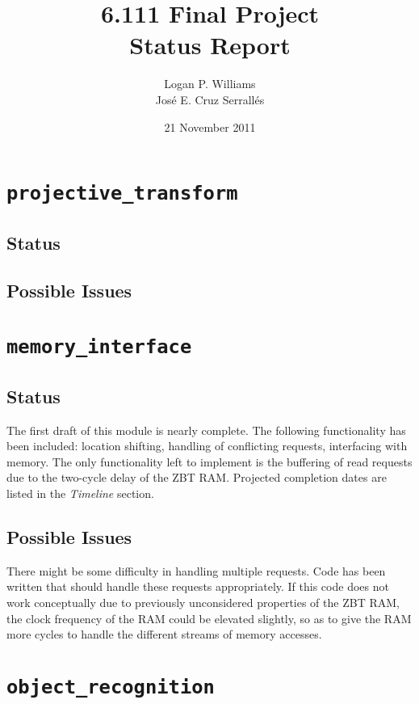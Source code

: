 \documentclass{article}
\title{6.111 Final Project\\Status Report}
\author{Logan P. Williams\\Jos\'{e} E. Cruz Serrall\'{e}s}
\date{21 November 2011}
\begin{document}
\maketitle


\section{{\tt projective\_transform}}
\subsection{Status} 
\subsection{Possible Issues}

\section{{\tt memory\_interface}}
\subsection{Status} The first draft of this module is nearly complete. The following functionality has been included: location shifting, handling of conflicting requests, interfacing with memory. The only functionality left to implement is the buffering of read requests due to the two-cycle delay of the ZBT RAM. Projected completion dates are listed in the {\it Timeline} section. 
\subsection{Possible Issues} There might be some difficulty in handling multiple requests. Code has been written that should handle these requests appropriately. If this code does not work conceptually due to previously unconsidered properties of the ZBT RAM, the clock frequency of the RAM could be elevated slightly, so as to give the RAM more cycles to handle the different streams of memory accesses.

\section{{\tt object\_recognition}}
\end{document}
